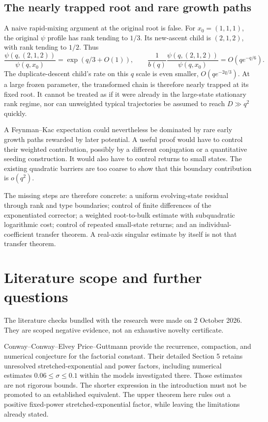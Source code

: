 \documentclass[11pt,letterpaper]{article}
\theoremstyle{remark}
\begin{document}
\subsection{The nearly trapped root and rare growth paths}\label{a58:fn:sec:trap}
A naive rapid-mixing argument at the original root is false. For $x_0=(1,1,1)$, the original $\psi$ profile has rank tending to $1/3$. Its new-ascent child is $(2,1,2)$, with rank tending to $1/2$. Thus
\[
 \frac{\psi(q,(2,1,2))}{\psi(q,x_0)}=\exp(q/3+O(1)),\qquad
 \frac1{b(q)}\frac{\psi(q,(2,1,2))}{\psi(q,x_0)}
 =O(qe^{-q/6}).
\]
The duplicate-descent child's rate on this $q$ scale is even smaller, $O(qe^{-2q/3})$. At a large frozen parameter, the transformed chain is therefore nearly trapped at its fixed root. It cannot be treated as if it were already in the large-state stationary rank regime, nor can unweighted typical trajectories be assumed to reach $D\gg q^2$ quickly.

A Feynman--Kac expectation could nevertheless be dominated by rare early growth paths rewarded by later potential. A useful proof would have to control their weighted contribution, possibly by a different conjugation or a quantitative seeding construction. It would also have to control returns to small states. The existing quadratic barriers are too coarse to show that this boundary contribution is $o(q^2)$.

The missing steps are therefore concrete: a uniform evolving-state residual through rank and type boundaries; control of finite differences of the exponentiated corrector; a weighted root-to-bulk estimate with subquadratic logarithmic cost; control of repeated small-state returns; and an individual-coefficient transfer theorem. A real-axis singular estimate by itself is not that transfer theorem.

\section{Literature scope and further questions}\label{a58:fn:sec:literature}
The literature checks bundled with the research were made on 2 October 2026. They are scoped negative evidence, not an exhaustive novelty certificate.

Conway--Conway--Elvey Price--Guttmann \cite{CCEG} provide the recurrence, compaction, and numerical conjecture for the factorial constant. Their detailed Section 5 retains unresolved stretched-exponential and power factors, including numerical estimates $0.06\le\sigma\le0.1$ within the models investigated there. Those estimates are not rigorous bounds. The shorter expression in the introduction must not be promoted to an established equivalent. The upper theorem here rules out a positive fixed-power stretched-exponential factor, while leaving the limitations already stated.
\end{document}
